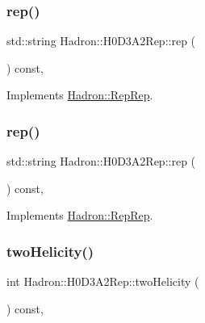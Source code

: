 \subsubsection{\texorpdfstring{rep()}{rep()}\hspace{0.1cm}{\footnotesize\ttfamily [2/3]}}
{\footnotesize\ttfamily std\+::string Hadron\+::\+H0\+D3\+A2\+Rep\+::rep (\begin{DoxyParamCaption}{ }\end{DoxyParamCaption}) const\hspace{0.3cm}{\ttfamily [inline]}, {\ttfamily [virtual]}}



Implements \mbox{\hyperlink{structHadron_1_1RepRep_ab3213025f6de249f7095892109575fde}{Hadron\+::\+Rep\+Rep}}.

\mbox{\label{structHadron_1_1H0D3A2Rep_a11e300b7b2215df67123d3d9e8747cb6}} 
\subsubsection{\texorpdfstring{rep()}{rep()}\hspace{0.1cm}{\footnotesize\ttfamily [3/3]}}
{\footnotesize\ttfamily std\+::string Hadron\+::\+H0\+D3\+A2\+Rep\+::rep (\begin{DoxyParamCaption}{ }\end{DoxyParamCaption}) const\hspace{0.3cm}{\ttfamily [inline]}, {\ttfamily [virtual]}}



Implements \mbox{\hyperlink{structHadron_1_1RepRep_ab3213025f6de249f7095892109575fde}{Hadron\+::\+Rep\+Rep}}.

\mbox{\label{structHadron_1_1H0D3A2Rep_a1e84c338f1fbedd7277f543926c976d6}} 
\subsubsection{\texorpdfstring{twoHelicity()}{twoHelicity()}\hspace{0.1cm}{\footnotesize\ttfamily [1/2]}}
{\footnotesize\ttfamily int Hadron\+::\+H0\+D3\+A2\+Rep\+::two\+Helicity (\begin{DoxyParamCaption}{ }\end{DoxyParamCaption}) const\hspace{0.3cm}{\ttfamily [inline]}, {\ttfamily [virtual]}}

